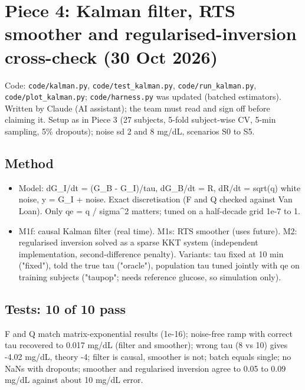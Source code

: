 \documentclass[11pt,a4paper]{article}
\providecommand{\tightlist}{\setlength{\itemsep}{0pt}\setlength{\parskip}{0pt}}
\begin{document}
\hypertarget{piece-4-kalman-filter-rts-smoother-and-regularised-inversion-cross-check-30-oct-2026}{%
\section{Piece 4: Kalman filter, RTS smoother and regularised-inversion
cross-check (30 Oct
2026)}\label{piece-4-kalman-filter-rts-smoother-and-regularised-inversion-cross-check-30-oct-2026}}

Code: \texttt{code/kalman.py}, \texttt{code/test\_kalman.py},
\texttt{code/run\_kalman.py}, \texttt{code/plot\_kalman.py};
\texttt{code/harness.py} was updated (batched estimators). Written by
Claude (AI assistant); the team must read and sign off before claiming
it. Setup as in Piece 3 (27 subjects, 5-fold subject-wise CV, 5-min
sampling, 5\% dropouts); noise sd 2 and 8 mg/dL, scenarios S0 to S5.

\hypertarget{method}{%
\subsection{Method}\label{method}}

\begin{itemize}
\tightlist
\item
  Model: dG\_I/dt = (G\_B - G\_I)/tau, dG\_B/dt = R, dR/dt = sqrt(q)
  white noise, y = G\_I + noise. Exact discretisation (F and Q checked
  against Van Loan). Only qe = q / sigma\^{}2 matters; tuned on a
  half-decade grid 1e-7 to 1.
\item
  M1f: causal Kalman filter (real time). M1s: RTS smoother (uses
  future). M2: regularised inversion solved as a sparse KKT system
  (independent implementation, second-difference penalty). Variants: tau
  fixed at 10 min ("fixed"), told the true tau ("oracle"), population
  tau tuned jointly with qe on training subjects ("taupop"; needs
  reference glucose, so simulation only).
\end{itemize}

\hypertarget{tests-10-of-10-pass}{%
\subsection{Tests: 10 of 10 pass}\label{tests-10-of-10-pass}}

F and Q match matrix-exponential results (1e-16); noise-free ramp with
correct tau recovered to 0.017 mg/dL (filter and smoother); wrong tau (8
vs 10) gives -4.02 mg/dL, theory -4; filter is causal, smoother is not;
batch equals single; no NaNs with dropouts; smoother and regularised
inversion agree to 0.05 to 0.09 mg/dL against about 10 mg/dL error.
\end{document}
